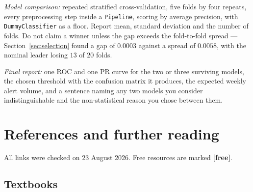 \documentclass[11pt]{article}
\begin{document}
\emph{Model comparison:} repeated stratified cross-validation, five folds by four
repeats, every preprocessing step inside a \texttt{Pipeline}, scoring by average
precision, with \texttt{DummyClassifier} as a floor. Report mean, standard
deviation and the number of folds. Do not claim a winner unless the gap exceeds
the fold-to-fold spread --- Section~\ref{sec:selection} found a gap of $0.0003$
against a spread of $0.0058$, with the nominal leader losing $13$ of $20$ folds.

\emph{Final report:} one ROC and one PR curve for the two or three surviving
models, the chosen threshold with the confusion matrix it produces, the expected
weekly alert volume, and a sentence naming any two models you consider
indistinguishable and the non-statistical reason you chose between them.

\section{References and further reading}

All links were checked on 23 August 2026. Free resources are marked
\textbf{[free]}.

\subsection*{Textbooks}
\end{document}
